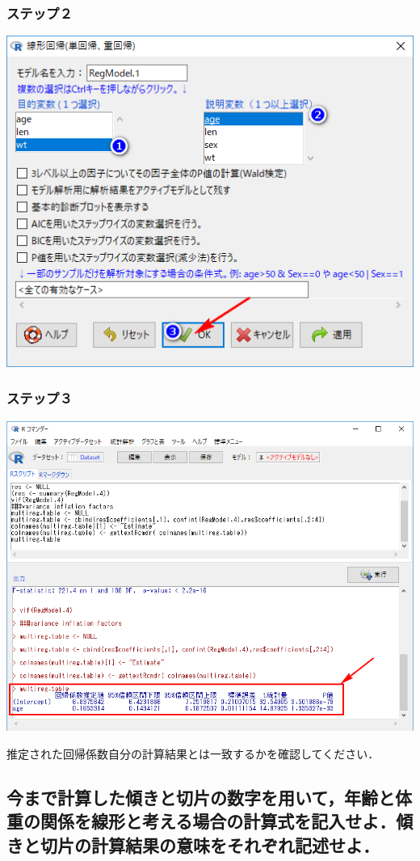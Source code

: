 \documentclass[11pt,]{problemset}
\begin{document}
\subsubsection{ステップ２}\label{-6}

\begin{center}\includegraphics[width=0.6\linewidth]{pic/lm01} \end{center}

\subsubsection{ステップ３}\label{-7}

\begin{center}\includegraphics[width=0.8\linewidth]{pic/lm02} \end{center}

推定された回帰係数自分の計算結果とは一致するかを確認してください．

\subsection{今まで計算した傾きと切片の数字を用いて，年齢と体重の関係を線形と考える場合の計算式を記入せよ．傾きと切片の計算結果の意味をそれぞれ記述せよ．}
\end{document}

